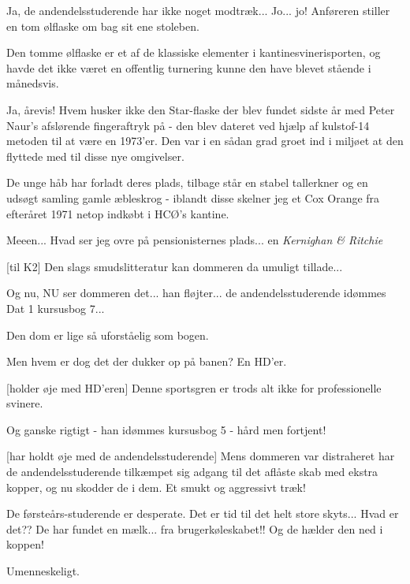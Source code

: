 \documentclass[a4paper,11pt]{article}
\begin{document}
\begin{sketch}
   Ja, de andendelsstuderende har ikke noget
  modtræk... Jo... jo! Anføreren stiller en tom ølflaske om bag sit ene
  stoleben.

   Den tomme ølflaske er et af de klassiske elementer i
  kantinesvinerisporten, og havde det ikke været en offentlig
  turnering kunne den have blevet stående i månedsvis.

   Ja, årevis! Hvem husker ikke den Star-flaske der blev fundet sidste år med Peter
  Naur's afslørende fingeraftryk på - den blev dateret ved hjælp af
  kulstof-14 metoden til at være en 1973'er.  Den var i en sådan grad groet
  ind i miljøet at den flyttede med til disse nye omgivelser.

   De unge håb har forladt deres plads, tilbage står en stabel tallerkner og en udsøgt
  samling gamle æbleskrog - iblandt disse skelner jeg et Cox Orange
  fra efteråret 1971 netop indkøbt i HCØ's kantine.

   Meeen... Hvad ser jeg ovre på pensionisternes plads... en
  {\em Kernighan \& Ritchie}

  [til K2] Den slags smudslitteratur kan dommeren
  da umuligt tillade...

   Og nu, NU ser dommeren det... han fløjter... de andendelsstuderende
  idømmes Dat 1 kursusbog 7...

   Den dom er lige så uforståelig som bogen.

   Men hvem er dog det der dukker op på banen?  En HD'er.


  [holder øje med HD'eren] Denne sportsgren er trods alt ikke for professionelle
  svinere.


   Og ganske rigtigt - han idømmes kursusbog 5 - hård men fortjent!

  [har holdt øje med de andendelsstuderende] Mens dommeren var distraheret har de andendelsstuderende tilkæmpet
  sig adgang til det aflåste skab med ekstra kopper, og nu skodder de i dem.  Et smukt og aggressivt træk!

   De førsteårs-studerende er desperate. Det er tid til det helt store
  skyts... Hvad er det?? De har fundet en mælk... fra brugerkøleskabet!!  Og de hælder
  den ned i koppen! 

   Umenneskeligt.


\end{sketch}
\end{document}
